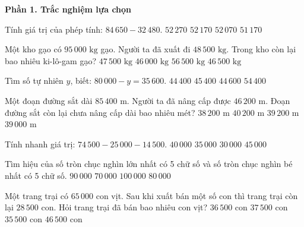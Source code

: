 \textbf{Phần 1. Trắc nghiệm lựa chọn}

\begin{ex} %
Tính giá trị của phép tính: $84\,650 - 32\,480$.
\choice
{$52\,270$}
{\True $52\,170$}
{$52\,070$}
{$51\,170$}
\end{ex}

\begin{ex} %
Một kho gạo có $95\,000\text{ kg}$ gạo. Người ta đã xuất đi $48\,500\text{ kg}$. Trong kho còn lại bao nhiêu ki-lô-gam gạo?
\choice
{$47\,500\text{ kg}$}
{$46\,000\text{ kg}$}
{$56\,500\text{ kg}$}
{\True $46\,500\text{ kg}$}
\end{ex}

\begin{ex} %
Tìm số tự nhiên $y$, biết: $80\,000 - y = 35\,600$.
\choice
{\True $44\,400$}
{$45\,400$}
{$44\,600$}
{$54\,400$}
\end{ex}

\begin{ex} %
Một đoạn đường sắt dài $85\,400\text{ m}$. Người ta đã nâng cấp được $46\,200\text{ m}$. Đoạn đường sắt còn lại chưa nâng cấp dài bao nhiêu mét?
\choice
{$38\,200\text{ m}$}
{$40\,200\text{ m}$}
{\True $39\,200\text{ m}$}
{$39\,000\text{ m}$}
\end{ex}

\begin{ex} %
Tính nhanh giá trị: $74\,500 - 25\,000 - 14\,500$.
\choice
{$40\,000$}
{\True $35\,000$}
{$30\,000$}
{$45\,000$}
\end{ex}

\begin{ex} %
Tìm hiệu của số tròn chục nghìn lớn nhất có 5 chữ số và số tròn chục nghìn bé nhất có 5 chữ số.
\choice
{$90\,000$}
{$70\,000$}
{$100\,000$}
{\True $80\,000$}
\end{ex}

\begin{ex} %
Một trang trại có $65\,000$ con vịt. Sau khi xuất bán một số con thì trang trại còn lại $28\,500$ con. Hỏi trang trại đã bán bao nhiêu con vịt?
\choice
{\True $36\,500$ con}
{$37\,500$ con}
{$35\,500$ con}
{$46\,500$ con}
\end{ex}

